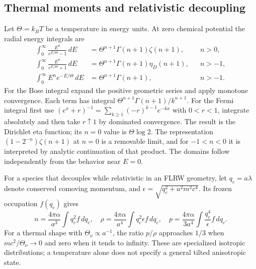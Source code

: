 \subsection{Thermal moments and relativistic decoupling}
\label{geo:thermal_initial}
Let $\Theta=k_BT$ be a temperature in energy units. At zero chemical potential the radial energy integrals are
\begin{align}
 \int_0^\infty\frac{E^n}{e^{E/\Theta}-1}\,dE
 &=\Theta^{n+1}\Gamma(n+1)\zeta(n+1),&&n>0,\nonumber\\
 \int_0^\infty\frac{E^n}{e^{E/\Theta}+1}\,dE
 &=\Theta^{n+1}\Gamma(n+1)\eta_D(n+1),&&n>-1,\nonumber\\
 \int_0^\infty E^n e^{-E/\Theta}\,dE
 &=\Theta^{n+1}\Gamma(n+1),&&n>-1.
 \label{geo:thermal_integrals}
\end{align}
For the Bose integral expand the positive geometric series and apply monotone convergence. Each term has integral $\Theta^{n+1}\Gamma(n+1)/k^{n+1}$. For the Fermi integral first use
$(e^x+r)^{-1}=\sum_{k\ge1}(-r)^{k-1}e^{-kx}$ with $0<r<1$, integrate absolutely and then take $r\uparrow1$ by dominated convergence. The result is the Dirichlet eta function; its $n=0$ value is $\Theta\log2$. The representation $(1-2^{-n})\zeta(n+1)$ at $n=0$ is a removable limit, and for $-1<n<0$ it is interpreted by analytic continuation of that product. The domains follow independently from the behavior near $E=0$.

For a species that decouples while relativistic in an FLRW geometry, let $q_c=a\lambda$ denote conserved comoving momentum, and $\epsilon=\sqrt{q_c^2+a^2m^2c^4}$. Its frozen occupation $f(q_c)$ gives
\begin{equation}
 n=\frac{4\pi\alpha}{a^3}\int q_c^2f\,dq_c,\quad
 \rho=\frac{4\pi\alpha}{a^4}\int q_c^2\epsilon f\,dq_c,\quad
 p=\frac{4\pi\alpha}{3a^4}\int\frac{q_c^4}{\epsilon}f\,dq_c.
 \label{geo:decoupled_moments}
\end{equation}
For a thermal shape with $\Theta_\nu\propto a^{-1}$, the ratio $p/\rho$ approaches $1/3$ when $mc^2/\Theta_\nu\to0$ and zero when it tends to infinity. These are specialized isotropic distributions; a temperature alone does not specify a general tilted anisotropic state.


